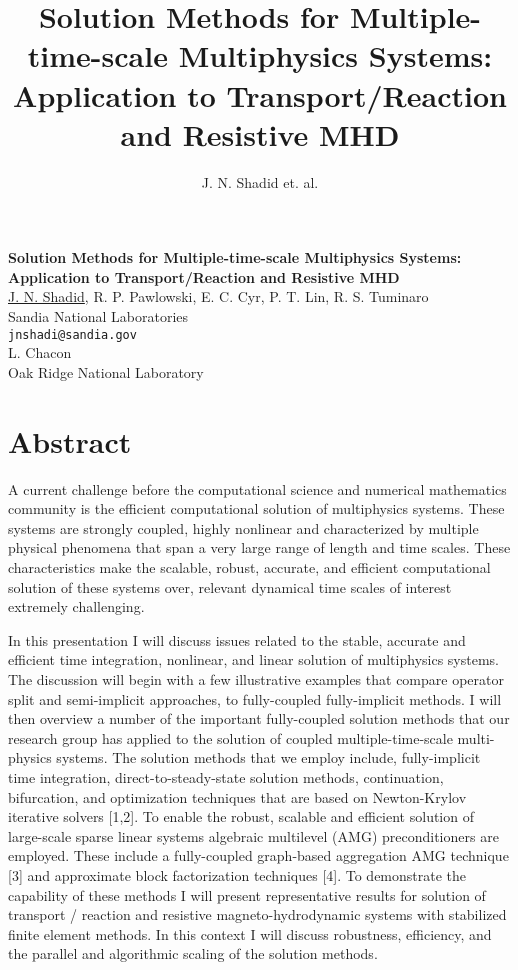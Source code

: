 \title{Solution Methods for Multiple-time-scale Multiphysics Systems: Application to Transport/Reaction and Resistive MHD}
\author{J. N. Shadid et. al.} 

\begin{center}

\textbf{\Large Solution Methods for Multiple-time-scale Multiphysics Systems: Application to Transport/Reaction and Resistive MHD}\\
\vspace{10mm}
{\large \underline{J. N. Shadid}, R. P. Pawlowski, E. C. Cyr, P. T. Lin, R. S. Tuminaro}\\
Sandia National Laboratories\\
{\tt jnshadi@sandia.gov}\\
\vspace{4mm}
{\large L. Chacon}\\
Oak Ridge National Laboratory

\end{center}

\section*{Abstract}

A current challenge before the computational science and numerical mathematics community is the efficient computational solution of multiphysics systems.  These systems are strongly coupled, highly nonlinear and characterized by multiple physical phenomena that span a very large range of length and time scales.   These characteristics make the scalable, robust, accurate, and efficient computational solution of these systems over, relevant dynamical time scales of interest extremely challenging.

In this presentation I will discuss issues related to the stable, accurate and efficient time integration, nonlinear, and linear solution of multiphysics systems. The discussion will begin with a few illustrative examples that compare operator split and semi-implicit approaches, to fully-coupled fully-implicit methods. I will then overview a number of the important fully-coupled solution methods that our research group has applied to the solution of coupled multiple-time-scale multi-physics systems. The solution methods that we employ include, fully-implicit time integration, direct-to-steady-state solution methods, continuation, bifurcation, and optimization techniques that are based on Newton-Krylov iterative solvers [1,2]. To enable the robust, scalable and efficient solution of large-scale sparse  linear systems algebraic multilevel (AMG) preconditioners are employed. These include a fully-coupled graph-based aggregation AMG technique [3] and approximate block factorization techniques [4]. To demonstrate the capability of these methods I will present representative results for solution of transport / reaction and resistive 
magneto-hydrodynamic systems with stabilized finite element methods. In this context I will discuss robustness, efficiency, and the parallel and algorithmic scaling of the solution methods.

